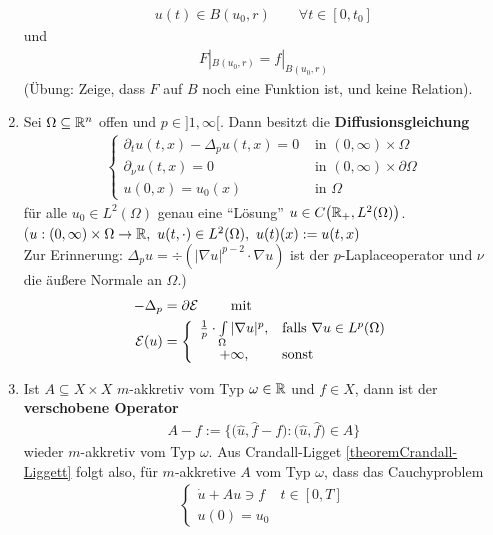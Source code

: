 \begin{korollar}
\begin{enumerate}[label=(\alph*)]
\begin{align*}
u(t)\in B(u_0,r)\qquad\forall t\in[0,t_0]
\end{align*}
und 
\begin{align*}
F|_{B(u_0,r)}=f|_{B(u_0,r)}
\end{align*}
(Übung: Zeige, dass $F$ auf $B$ noch eine Funktion ist, und keine Relation).
\item Sei $\Omega\subseteq\mathbb{R}^n$ offen und $p\in]1,\infty[$. Dann besitzt die \textbf{Diffusionsgleichung}
\begin{align}\label{eqDiffusionsgleichung}\tag{Diffu}
\left\lbrace\begin{array}{rl}
\partial_t u(t,x)-\Delta_p u(t,x)=0 &\text{ in }(0,\infty)\times\Omega\\
\partial_\nu u(t,x)=0 &\text{ in }(0,\infty)\times\partial\Omega\\
u(0,x)=u_0(x) &\text{ in }\Omega
\end{array}\right.
\end{align}
für alle $u_0\in L^2(\Omega)$ genau eine  ``Lösung'' $u\in C\big(\mathbb{R}_+, L^2(\Omega)\big)$.\\
($u:(0,\infty)\times\Omega\to\mathbb{R},~u(t,\cdot)\in L^2(\Omega),~u(t)(x):=u(t,x)$\\
Zur Erinnerung: $\Delta_p u=\div\left(|\nabla u|^{p-2}\cdot\nabla u\right)$ ist der $p$-Laplaceoperator und $\nu$ die äußere Normale an $\Omega$.)
\begin{align*}
-\Delta_p&=\partial\mathcal{E}\qquad\text{ mit }\\
\mathcal{E}(u)&=\left\lbrace\begin{array}{cl}
\frac{1}{p}\cdot\int\limits_\Omega |\nabla u|^p, &\text{falls }\nabla u\in L^p(\Omega)\\
+\infty ,&\text{sonst }
\end{array}\right.
\end{align*}
\item Ist $A\subseteq X\times X$ $m$-akkretiv vom Typ $\omega\in\mathbb{R}$ und $f\in X$, dann ist der \textbf{verschobene Operator}
\begin{align*}
A-f:=\Big\lbrace\big(\hat{u},\hat{f}-f\big):\big(\hat{u},\hat{f}\big)\in A\Big\rbrace
\end{align*}
wieder $m$-akkretiv vom Typ $\omega$. Aus Crandall-Ligget \ref{theoremCrandall-Liggett} folgt also, für $m$-akkretive $A$ vom Typ $\omega$, dass das Cauchyproblem
\begin{align*}
\left\lbrace\begin{array}{rl}
\dot{u}+Au\ni f & t\in[0,T]\\
u(0)=u_0
\end{array}\right.

\end{align*}
\end{enumerate}
\end{korollar}
